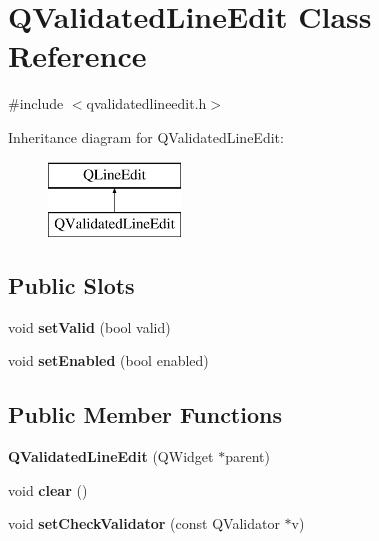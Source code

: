 \hypertarget{class_q_validated_line_edit}{}\section{Q\+Validated\+Line\+Edit Class Reference}
\label{class_q_validated_line_edit}


{\ttfamily \#include $<$qvalidatedlineedit.\+h$>$}

Inheritance diagram for Q\+Validated\+Line\+Edit\+:\begin{figure}[H]
\begin{center}
\leavevmode
\includegraphics[height=2.000000cm]{class_q_validated_line_edit}
\end{center}
\end{figure}
\subsection*{Public Slots}
\begin{DoxyCompactItemize}
\item 
\mbox{\label{class_q_validated_line_edit_ad9984e2e463cc7fbf28fe334498a1df5}} 
void {\bfseries set\+Valid} (bool valid)
\item 
\mbox{\label{class_q_validated_line_edit_af0a2d32e9d2fb08c5069852cf4bfc860}} 
void {\bfseries set\+Enabled} (bool enabled)
\end{DoxyCompactItemize}
\subsection*{Public Member Functions}
\begin{DoxyCompactItemize}
\item 
\mbox{\label{class_q_validated_line_edit_a542bbdf8df060026a4b43f76a000193c}} 
{\bfseries Q\+Validated\+Line\+Edit} (Q\+Widget $\ast$parent)
\item 
\mbox{\label{class_q_validated_line_edit_aee2a648f6f4904f21e55871afbddefa9}} 
void {\bfseries clear} ()
\item 
\mbox{\label{class_q_validated_line_edit_af365be1760e17fd1ea6b430fa6005bd2}} 
void {\bfseries set\+Check\+Validator} (const Q\+Validator $\ast$v)
\end{DoxyCompactItemize}

